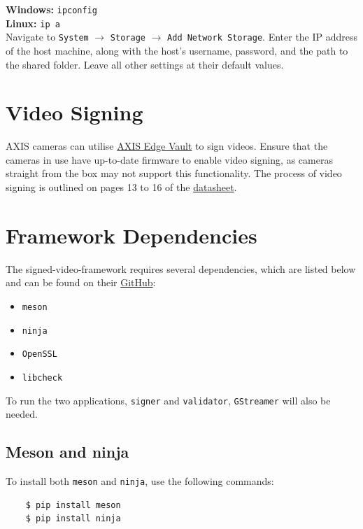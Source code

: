 \documentclass[a4paper,12pt]{article}
\begin{document}
\noindent \textbf{Windows:} \texttt{ipconfig}\\
\textbf{Linux:}  \texttt{ip a} \\

Navigate to \texttt{System} \(\to\) \texttt{Storage} \(\to\) \texttt{Add Network Storage}. Enter the IP address of the host machine, along with the host's username, password, and the path to the shared folder. Leave all other settings at their default values.

\section{Video Signing}

AXIS cameras can utilise \href{https://www.axis.com/dam/public/0e/54/e6/axis-edge-vault-en-US-419338.pdf}{AXIS Edge Vault} to sign videos. Ensure that the cameras in use have up-to-date firmware to enable video signing, as cameras straight from the box may not support this functionality. The process of video signing is outlined on pages 13 to 16 of the \href{https://help.axis.com/en-us/axis-p3265-lve}{datasheet}.

\section{Framework Dependencies}

The signed-video-framework requires several dependencies, which are listed below and can be found on their \href{https://github.com/AxisCommunications/signed-video-framework}{GitHub}:

\begin{itemize}
    \item \texttt{meson}
    \item \texttt{ninja}
    \item \texttt{OpenSSL}
    \item \texttt{libcheck}
\end{itemize}

To run the two applications, \texttt{signer} and \texttt{validator}, \texttt{GStreamer} will also be needed.

\subsection{Meson and ninja}

To install both \texttt{meson} and \texttt{ninja}, use the following commands:

\begin{verbatim}
    $ pip install meson
    $ pip install ninja
\end{verbatim}
\end{document}
